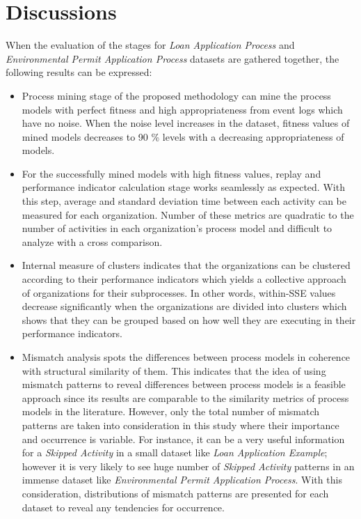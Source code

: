 


\section{Discussions}
\label{sec:discussions}
When the evaluation of the stages for \textit{Loan Application Process} and \textit{Environmental Permit Application Process} datasets are gathered together, the following results can be expressed:

\begin{itemize}
	\item Process mining stage of the proposed methodology can mine the process models with perfect fitness and high appropriateness from event logs which have no noise. When the noise level increases in the dataset, fitness values of mined models decreases to 90 \% levels with a decreasing appropriateness of models.
	\item For the successfully mined models with high fitness values, replay and performance indicator calculation stage works seamlessly as expected. With this step, average and standard deviation time between each activity can be measured for each organization. Number of these metrics are quadratic to the number of activities in each organization's process model and difficult to analyze with a cross comparison.
	\item Internal measure of clusters indicates that the organizations can be clustered according to their performance indicators which yields a collective approach of organizations for their subprocesses. In other words, within-SSE values decrease significantly when the organizations are divided into clusters which shows that they can be grouped based on how well they are executing in their performance indicators.
	\item Mismatch analysis spots the differences between process models in coherence with structural similarity of them. This indicates that the idea of using mismatch patterns to reveal differences between process models is a feasible approach since its results are comparable to the similarity metrics of process models in the literature. However, only the total number of mismatch patterns are taken into consideration in this study where their importance and occurrence is variable. For instance, it can be a very useful information for a \textit{Skipped Activity} in a small dataset like \textit{Loan Application Example}; however it is very likely to see huge number of \textit{Skipped Activity} patterns in an immense dataset like \textit{Environmental Permit Application Process}. With this consideration, distributions of mismatch patterns are presented for each dataset to reveal any tendencies for occurrence. 

\end{itemize}

